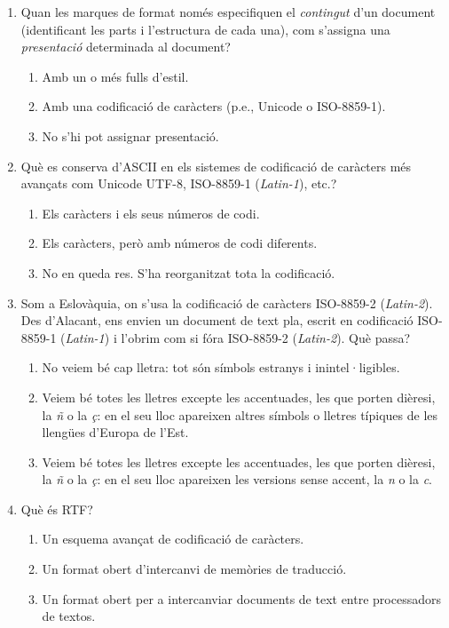\begin{enumerate}
\item Quan les marques de format només especifiquen el
  \emph{contingut} d'un document (identificant les parts i
  l'estructura de cada una), com s'assigna una \emph{presentació}
  determinada al document?
  \begin{enumerate}
  \item Amb un o més fulls d'estil.
  \item Amb una codificació de caràcters (p.e., Unicode o ISO-8859-1).
  \item No s'hi pot assignar presentació.
  \end{enumerate}

\item Què es conserva d'ASCII en els sistemes de codificació de
  caràcters més avançats com Unicode UTF-8, ISO-8859-1
  (\emph{Latin-1}), etc.?
  \begin{enumerate}
  \item Els caràcters i els seus números de codi.
  \item Els caràcters, però amb números de codi diferents.
  \item No en queda res. S'ha reorganitzat tota la codificació.
  \end{enumerate}

\item Som a Eslovàquia, on s'usa la codificació de caràcters
  ISO-8859-2 (\emph{Latin-2}). Des d'Alacant, ens envien un document
  de text pla, escrit en codificació ISO-8859-1 (\emph{Latin-1}) i
  l'obrim com si fóra ISO-8859-2 (\emph{Latin-2}). Què passa?
  \begin{enumerate}
  \item No veiem bé cap lletra: tot són símbols estranys i
    inintel·ligibles.
  \item Veiem bé totes les lletres excepte les accentuades, les que
    porten dièresi, la \emph{ñ} o la \emph{ç}: en el seu lloc
    apareixen altres símbols o lletres típiques de les llengües
    d'Europa de l'Est.
  \item Veiem bé totes les lletres excepte les accentuades, les que
    porten dièresi, la \emph{ñ} o la \emph{ç}: en el seu lloc
    apareixen les versions sense accent, la \emph{n} o la \emph{c}.
\end{enumerate}

\item Què és RTF?
  \begin{enumerate}
  \item Un esquema avançat de codificació de caràcters.
  \item Un format obert d'intercanvi de memòries de traducció.
  \item Un format obert per a intercanviar documents de text entre
    processadors de textos.
  \end{enumerate}


\end{enumerate}
